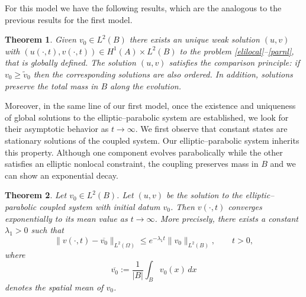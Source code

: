 \documentclass[reqno]{amsart}
\numberwithin{equation}{section}
\newtheorem{theorem}{Theorem}[section]
\begin{document}
For this model we have the following results, which are the analogous to the previous results for the first model.



\begin{theorem} Given $v_0\in L^2(B)$ there exists an unique weak solution $(u,v)$ with $(u(\cdot, t), v(\cdot, t) ) \in H^1(A)\times L^2(B)$ to the problem \eqref{elilocal}--\eqref{parnl}, that is globally defined. The solution $(u,v)$ satisfies the comparison principle: if $v_0\ge \widetilde{v}_0$ then the corresponding solutions are also ordered. 
In addition, solutions preserve the total mass in $B$ along the evolution.
\end{theorem}

Moreover, in the same line of our first model, once the existence and uniqueness of global solutions to the elliptic--parabolic system are established, we look for their asymptotic behavior as $t \to \infty$. We first observe that constant states are stationary solutions of the coupled system. Our elliptic--parabolic system inherits this property. Although one component evolves parabolically while the other satisfies an elliptic nonlocal constraint, the coupling preserves mass in $B$ and we can show
an exponential decay.

\begin{theorem} \label{teo.asymp.2}
Let $v_0 \in L^2(B)$. Let $(u,v)$ be the solution to the elliptic--parabolic coupled system with initial datum $v_0$. Then $v(\cdot,t)$ converges exponentially to its mean value as $t \to \infty$. More precisely, there exists a constant $\lambda_1 > 0$ such that
\[
\| v(\cdot,t) - \overline{v_0} \|_{L^2(\Omega)}
\le
 e^{-\lambda_1 t}\|v_0\|_{L^2(B)},
\qquad t > 0,
\]
where
\[
\overline{v_0} := \frac{1}{|B|} \int_B v_0(x)\,dx
\]
denotes the spatial mean of $v_0$.
\end{theorem}
\end{document}

